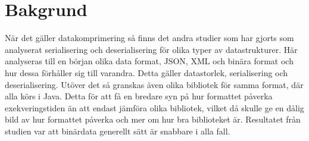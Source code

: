 \section{Bakgrund}
\label{sec:tim-background}
När det gäller datakomprimering så finns det andra studier som har gjorts som analyserat serialisering och deserialisering för olika typer av datastrukturer\cite{serialization}. Här analyseras till en början olika data format, JSON, XML och binära format och hur dessa förhåller sig till varandra. Detta gäller datastorlek, serialisering och deserialisering. Utöver det så granskas även olika bibliotek för samma format, där alla körs i Java. Detta för att få en bredare syn på hur formattet påverka exekveringstiden än att endast jämföra olika bibliotek, vilket då skulle ge en dålig bild av hur formattet påverka och mer om hur bra biblioteket är. Resultatet från studien var att binärdata generellt sätt är snabbare i alla fall.


